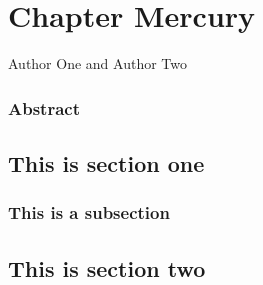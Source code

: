 \chapter[Mercury chapter entry for ToC]{Chapter Mercury}

\hyphenation{}

{\large\color{eurgreen} Author One and Author Two}
\emptyline
\emptyline
\emptyline


\subsection*{Abstract}
\blindtext
\clearpage

\section{This is section one}
\blindmathpaper
\subsection{This is a subsection}
\blindmathpaper

\section{This is section two}
\blindmathpaper

